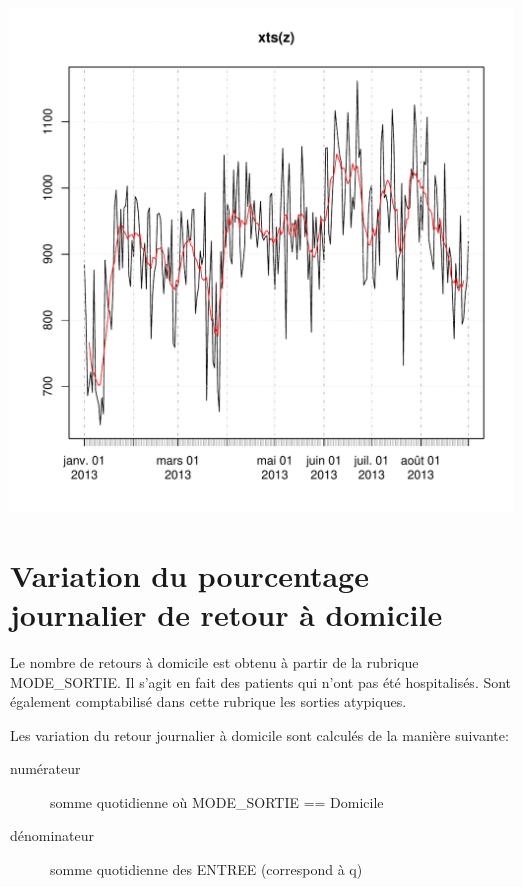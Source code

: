 \documentclass[12pt,english,french,twoside]{report}\usepackage[]{graphicx}\usepackage[]{color}
\makeatletter
\def\maxwidth{ %
  \ifdim\Gin@nat@width>\linewidth
    \linewidth
  \else
    \Gin@nat@width
  \fi
}
\makeatother
\begin{document}
\includegraphics[width=\maxwidth]{figure/passages_totaux3} 




\section{Variation du pourcentage journalier de retour à domicile}

Le nombre de retours à domicile est obtenu à partir de la rubrique MODE\_SORTIE. Il s'agit en fait des patients qui n'ont pas été hospitalisés. Sont également comptabilisé dans cette rubrique les sorties atypiques.

Les variation du retour journalier à domicile sont calculés de la manière suivante:
\begin{description}
  \item[numérateur] somme quotidienne où MODE\_SORTIE == Domicile
  \item[dénominateur] somme quotidienne des ENTREE (correspond à q)
\end{description}
\end{document}
